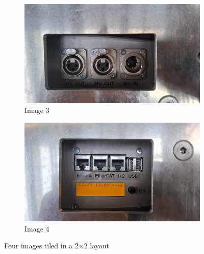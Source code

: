 \begin{figure}[ht]
        \begin{subfigure}[b]{0.49\linewidth}
            \centering
            \includegraphics[width=\linewidth]{images/sec2/youbot_power.jpg}
            \caption{Image 3}
        \end{subfigure}
        \hfill
        \begin{subfigure}[b]{0.49\linewidth}
            \centering
            \includegraphics[width=\linewidth]{images/sec2/youbot_screen.jpg}
            \caption{Image 4}
        \end{subfigure}

        \caption{Four images tiled in a 2×2 layout}
        \label{fig:youbot-quad}
    \end{figure}